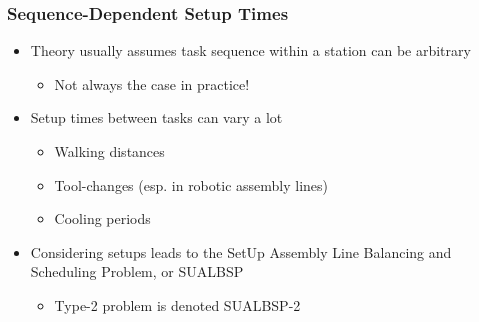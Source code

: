 \documentclass{beamer}
\begin{document}
\begin{frame}
\begin{figure}
\end{figure}
\end{frame}

\begin{frame}
\frametitle{Sequence-Dependent Setup Times}
\begin{itemize}
	\item Theory usually assumes task sequence within a station can be arbitrary\vspace{2mm}
	\begin{itemize}
		\item Not always the case in practice!\vspace{2mm}\pause
	\end{itemize}
	\item Setup times between tasks can vary a lot\vspace{2mm}
	\begin{itemize}
		\item Walking distances\vspace{1mm}
		\item Tool-changes (esp. in robotic assembly lines)\vspace{1mm}
		\item Cooling periods\vspace{3mm}\pause
	\end{itemize}
	\item Considering setups leads to the SetUp Assembly Line Balancing and Scheduling Problem, or SUALBSP\vspace{1mm}
	\begin{itemize}
		\item Type-2 problem is denoted SUALBSP-2
	\end{itemize}
\end{itemize}
\end{frame}
\end{document}
